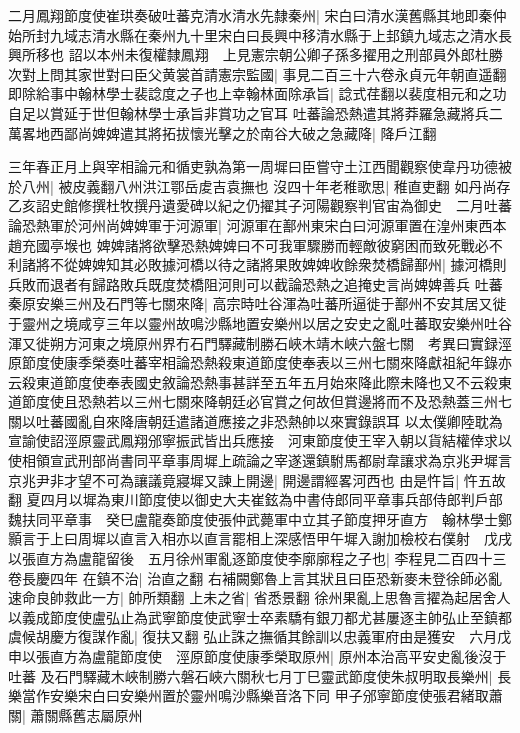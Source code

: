 二月鳳翔節度使崔珙奏破吐蕃克清水清水先隸秦州|{
	宋白曰清水漢舊縣其地即秦仲始所封九域志清水縣在秦州九十里宋白曰長興中移清水縣于上邽鎮九域志之清水長興所移也}
詔以本州未復權隸鳳翔　上見憲宗朝公卿子孫多擢用之刑部員外郎杜勝次對上問其家世對曰臣父黄裳首請憲宗監國|{
	事見二百三十六卷永貞元年朝直遥翻}
即除給事中翰林學士裴諗度之子也上幸翰林面除承旨|{
	諗式荏翻以裴度相元和之功自足以賞延于世但翰林學士承旨非賞功之官耳}
吐蕃論恐熱遣其將莽羅急藏將兵二萬畧地西鄙尚婢婢遣其將拓拔懷光擊之於南谷大破之急藏降|{
	降戶江翻}


三年春正月上與宰相論元和循吏孰為第一周墀曰臣嘗守土江西聞觀察使韋丹功德被於八州|{
	被皮義翻八州洪江鄂岳䖍吉袁撫也}
沒四十年老稚歌思|{
	稚直吏翻}
如丹尚存乙亥詔史館修撰杜牧撰丹遺愛碑以紀之仍擢其子河陽觀察判官宙為御史　二月吐蕃論恐熱軍於河州尚婢婢軍于河源軍|{
	河源軍在鄯州東宋白曰河源軍置在湟州東西本趙充國亭堠也}
婢婢諸將欲擊恐熱婢婢曰不可我軍驟勝而輕敵彼窮困而致死戰必不利諸將不從婢婢知其必敗據河橋以待之諸將果敗婢婢收餘衆焚橋歸鄯州|{
	據河橋則兵敗而退者有歸路敗兵既度焚橋阻河則可以截論恐熱之追掩史言尚婢婢善兵}
吐蕃秦原安樂三州及石門等七關來降|{
	高宗時吐谷渾為吐蕃所逼徙于鄯州不安其居又徙于靈州之境咸亨三年以靈州故鳴沙縣地置安樂州以居之安史之亂吐蕃取安樂州吐谷渾又徙朔方河東之境原州界冇石門驛藏制勝石峽木靖木峽六盤七關　考異曰實録涇原節度使康季榮奏吐蕃宰相論恐熱殺東道節度使奉表以三州七關來降獻祖紀年錄亦云殺東道節度使奉表國史敘論恐熱事甚詳至五年五月始來降此際未降也又不云殺東道節度使且恐熱若以三州七關來降朝廷必官賞之何故但賞邊將而不及恐熱蓋三州七關以吐蕃國亂自來降唐朝廷遣諸道應接之非恐熱帥以來實錄誤耳}
以太僕卿陸耽為宣諭使詔涇原靈武鳳翔邠寧振武皆出兵應接　河東節度使王宰入朝以貨結權倖求以使相領宣武刑部尚書同平章事周墀上疏論之宰遂還鎮駙馬都尉韋讓求為京兆尹墀言京兆尹非才望不可為讓議竟寢墀又諫上開邊|{
	開邊謂經畧河西也}
由是忤旨|{
	忤五故翻}
夏四月以墀為東川節度使以御史大夫崔鉉為中書侍郎同平章事兵部侍郎判戶部魏扶同平章事　癸巳盧龍奏節度使張仲武薨軍中立其子節度押牙直方　翰林學士鄭顥言于上曰周墀以直言入相亦以直言罷相上深感悟甲午墀入謝加檢校右僕射　戊戌以張直方為盧龍留後　五月徐州軍亂逐節度使李廓廓程之子也|{
	李程見二百四十三卷長慶四年}
在鎮不治|{
	治直之翻}
右補闕鄭魯上言其狀且曰臣恐新麥未登徐師必亂速命良帥救此一方|{
	帥所類翻}
上未之省|{
	省悉景翻}
徐州果亂上思魯言擢為起居舍人以義成節度使盧弘止為武寧節度使武寧士卒素驕有銀刀都尤甚屢逐主帥弘止至鎮都虞候胡慶方復謀作亂|{
	復扶又翻}
弘止誅之撫循其餘訓以忠義軍府由是獲安　六月戊申以張直方為盧龍節度使　涇原節度使康季榮取原州|{
	原州本治高平安史亂後沒于吐蕃}
及石門驛藏木峽制勝六磐石峽六關秋七月丁巳靈武節度使朱叔明取長樂州|{
	長樂當作安樂宋白曰安樂州置於靈州鳴沙縣樂音洛下同}
甲子邠寧節度使張君緒取蕭關|{
	蕭關縣舊志屬原州}
